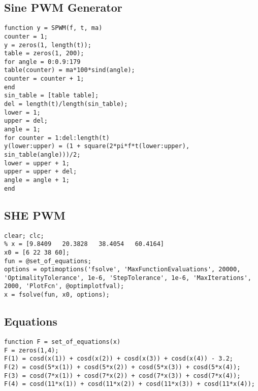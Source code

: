 \subsection{Sine PWM Generator}
\begin{lstlisting}
function y = SPWM(f, t, ma)
counter = 1;
y = zeros(1, length(t));
table = zeros(1, 200);
for angle = 0:0.9:179
table(counter) = ma*100*sind(angle);
counter = counter + 1;
end
sin_table = [table table];
del = length(t)/length(sin_table);
lower = 1;
upper = del;
angle = 1;
for counter = 1:del:length(t)
y(lower:upper) = (1 + square(2*pi*f*t(lower:upper), sin_table(angle)))/2;
lower = upper + 1;
upper = upper + del;
angle = angle + 1;
end

\end{lstlisting}

\subsection{SHE PWM}
\begin{lstlisting}
clear; clc;
% x = [9.8409   20.3828   38.4054   60.4164]
x0 = [6 22 38 60];
fun = @set_of_equations;
options = optimoptions('fsolve', 'MaxFunctionEvaluations', 20000, 'OptimalityTolerance', 1e-6, 'StepTolerance', 1e-6, 'MaxIterations', 2000, 'PlotFcn', @optimplotfval);
x = fsolve(fun, x0, options);
\end{lstlisting}
\subsection{Equations}
\begin{lstlisting}
function F = set_of_equations(x)
F = zeros(1,4);
F(1) = cosd(x(1)) + cosd(x(2)) + cosd(x(3)) + cosd(x(4)) - 3.2;
F(2) = cosd(5*x(1)) + cosd(5*x(2)) + cosd(5*x(3)) + cosd(5*x(4));
F(3) = cosd(7*x(1)) + cosd(7*x(2)) + cosd(7*x(3)) + cosd(7*x(4));
F(4) = cosd(11*x(1)) + cosd(11*x(2)) + cosd(11*x(3)) + cosd(11*x(4));
\end{lstlisting}